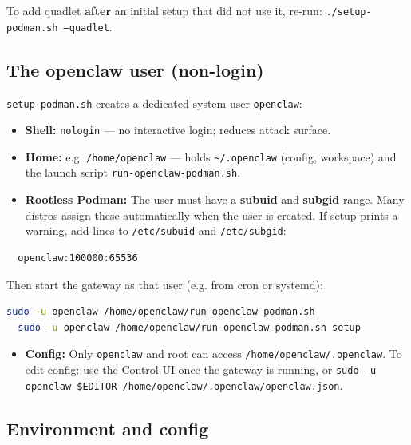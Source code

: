 To add quadlet \textbf{after} an initial setup that did not use it, re-run: \texttt{./setup-podman.sh --quadlet}.

\subsection{The openclaw user (non-login)}


\texttt{setup-podman.sh} creates a dedicated system user \texttt{openclaw}:

\begin{itemize}
  \item \textbf{Shell:} \texttt{nologin} — no interactive login; reduces attack surface.
  \item \textbf{Home:} e.g. \texttt{/home/openclaw} — holds \texttt{\textasciitilde{}/.openclaw} (config, workspace) and the launch script \texttt{run-openclaw-podman.sh}.
  \item \textbf{Rootless Podman:} The user must have a \textbf{subuid} and \textbf{subgid} range. Many distros assign these automatically when the user is created. If setup prints a warning, add lines to \texttt{/etc/subuid} and \texttt{/etc/subgid}:
\end{itemize}


\begin{lstlisting}
  openclaw:100000:65536
\end{lstlisting}


Then start the gateway as that user (e.g. from cron or systemd):

\begin{lstlisting}[language=bash]
  sudo -u openclaw /home/openclaw/run-openclaw-podman.sh
  sudo -u openclaw /home/openclaw/run-openclaw-podman.sh setup
\end{lstlisting}


\begin{itemize}
  \item \textbf{Config:} Only \texttt{openclaw} and root can access \texttt{/home/openclaw/.openclaw}. To edit config: use the Control UI once the gateway is running, or \texttt{sudo -u openclaw \$EDITOR /home/openclaw/.openclaw/openclaw.json}.
\end{itemize}


\subsection{Environment and config}


